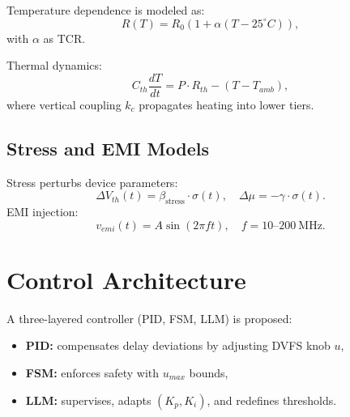 \documentclass[conference]{IEEEtran}
\begin{document}
Temperature dependence is modeled as:
\begin{equation}
R(T) = R_0 \left( 1 + \alpha (T-25^\circ C) \right),
\end{equation}
with $\alpha$ as TCR.  

Thermal dynamics:
\begin{equation}
C_{th}\frac{dT}{dt} = P \cdot R_{th} - (T - T_{amb}),
\end{equation}
where vertical coupling $k_c$ propagates heating into lower tiers.

\subsection{Stress and EMI Models}
Stress perturbs device parameters:
\begin{equation}
\Delta V_{th}(t) = \beta_{\mathrm{stress}} \cdot \sigma(t), \quad
\Delta \mu = -\gamma \cdot \sigma(t).
\end{equation}
EMI injection:
\begin{equation}
v_{emi}(t) = A \sin(2\pi f t), \quad f=10\text{--}200~\mathrm{MHz}.
\end{equation}

\section{Control Architecture}
A three-layered controller (PID, FSM, LLM) is proposed:
\begin{itemize}
  \item \textbf{PID:} compensates delay deviations by adjusting DVFS knob $u$,
  \item \textbf{FSM:} enforces safety with $u_{max}$ bounds,
  \item \textbf{LLM:} supervises, adapts $(K_p,K_i)$, and redefines thresholds.
\end{itemize}
\end{document}
